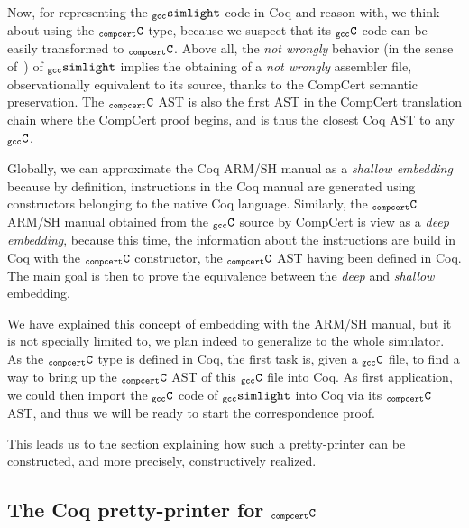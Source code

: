 \documentclass[a4paper, 11pt]{article}
\newcommand{\ccert}{CompCert\xspace}
\newcommand{\gccSL}{$_{\tt gcc}{\tt simlight}$\xspace}
\newcommand{\C}{$_{\tt compcert}{\tt C}$\xspace}
\newcommand{\gccC}{$_{\tt gcc}{\tt C}$\xspace}
\begin{document}
Now, for representing the \gccSL code in Coq and reason with, we think about using the \C type, because we suspect that its \gccC code can be easily transformed to \C. Above all, the \emph{not wrongly} behavior (in the sense of~\cite{Leroy-Compcert-CACM}) of \gccSL implies the obtaining of a \emph{not wrongly} assembler file, observationally equivalent to its source, thanks to the \ccert semantic preservation. The \C AST is also the first AST in the \ccert translation chain where the \ccert proof begins, and is thus the closest Coq AST to any \gccC.

\hspace{1ex}

Globally, we can approximate the Coq ARM/SH manual as a \emph{shallow embedding} because by definition, instructions in the Coq manual are generated using constructors belonging to the native Coq language. Similarly, the \C ARM/SH manual obtained from the \gccC source by \ccert is view as a \emph{deep embedding}, because this time, the information about the instructions are build in Coq with the \C constructor, the \C AST having been defined in Coq. The main goal is then to prove the equivalence between the \emph{deep} and \emph{shallow} embedding.

We have explained this concept of embedding with the ARM/SH manual, but it is not specially limited to, we plan indeed to generalize to the whole simulator. As the \C type is defined in Coq, the first task is, given a \gccC file, to find a way to bring up the \C AST of this \gccC file into Coq. As first application, we could then import the \gccC code of \gccSL into Coq via its \C AST, and thus we will be ready to start the correspondence proof.

\hspace{1ex}

This leads us to the section explaining how such a pretty-printer can be constructed, and more precisely, constructively realized.


\subsection{The Coq pretty-printer for \C}
\end{document}
